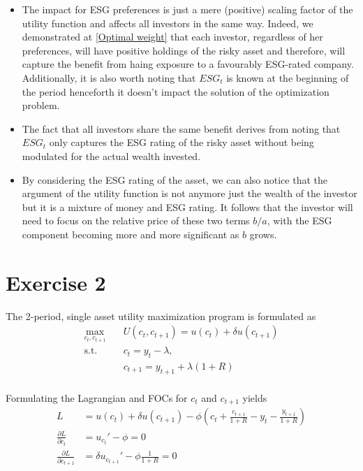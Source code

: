 \documentclass[12pt]{article}
\begin{document}
	\begin{itemize}
		\item The impact for ESG preferences is just a mere (positive) scaling factor of the utility function and affects all investors in the same way. Indeed, we demonstrated at \ref{Optimal weight} that each investor, regardless of her preferences, will have positive holdings of the risky asset and therefore, will capture the benefit from haing exposure to a favourably ESG-rated company. Additionally, it is also worth noting that $ESG_t$ is known at the beginning of the period  henceforth it doesn't impact the solution of the optimization problem.   
		\item The fact that all investors share the same benefit derives from noting that $ESG_t$ only captures the ESG rating of the risky asset without being modulated for the actual wealth invested.
		\item By considering the ESG rating of the asset, we can also notice that the argument of the utility function is not anymore just the wealth of the investor but it is a mixture of money and ESG rating. It follows that the investor will need to focus on the relative price of these two terms $b/a$, with the ESG component becoming more and more significant as $b$ grows. 
	\end{itemize}
	
	\section{Exercise 2}
	The 2-period, single asset utility maximization program is formulated as
	\begin{align*}
		\max_{c_t, c_{t+1}} \quad & U(c_t, c_{t+1}) = u(c_t) + \delta u(c_{t+1}) \\
		\textrm{s.t.} \quad & c_t = y_t - \lambda,\\
		\quad & c_{t+1} = y_{t+1} + \lambda (1+R)\\
	\end{align*}
	
	
	Formulating the Lagrangian and FOCs for $c_t$ and $c_{t+1}$ yields
	\begin{align*}
		L &= u(c_t) + \delta u(c_{t+1}) - \phi \left(c_t + \frac{c_{t+1}}{1+R} - y_t - \frac{y_{t+1}}{1+R}\right)\\
		\frac{\partial L}{\partial c_t} &= u_{c_t}' - \phi = 0\\
		\frac{\partial L}{\partial c_{t+1}} &= \delta u_{c_{t+1}}' - \phi \frac{1}{1+R}= 0
	\end{align*}
	
\end{document}
